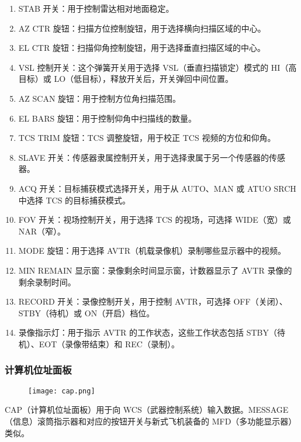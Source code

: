 \begin{enumerate}
	\item STAB 开关：用于控制雷达相对地面稳定。
	\item AZ CTR 旋钮：扫描方位控制旋钮，用于选择横向扫描区域的中心。
	\item EL CTR 旋钮：扫描仰角控制旋钮，用于选择垂直扫描区域的中心。
	\item VSL 控制开关：这个弹簧开关用于选择 VSL（垂直扫描锁定）模式的 HI（高目标）或 LO（低目标），释放开关后，开关弹回中间位置。
	\item AZ SCAN 旋钮：用于控制方位角扫描范围。
	\item EL BARS 旋钮：用于控制仰角中扫描线的数量。
	\item TCS TRIM 旋钮：TCS 调整旋钮，用于校正 TCS 视频的方位和仰角。
	\item SLAVE 开关：传感器隶属控制开关，用于选择隶属于另一个传感器的传感器。
	\item ACQ 开关：目标捕获模式选择开关，用于从 AUTO、MAN 或 ATUO SRCH 中选择 TCS 的目标捕获模式。
	\item FOV 开关：视场控制开关，用于选择 TCS 的视场，可选择 WIDE（宽）或 NAR（窄）。
	\item MODE 旋钮：用于选择 AVTR（机载录像机）录制哪些显示器中的视频。
	\item MIN REMAIN 显示窗：录像剩余时间显示窗，计数器显示了 AVTR 录像的剩余录制时间。
	\item RECORD 开关：录像控制开关，用于控制 AVTR，可选择 OFF（关闭）、STBY（待机）或 ON（开启）档位。
	\item 录像指示灯：用于指示 AVTR 的工作状态，这些工作状态包括 STBY（待机）、EOT（录像带结束）和 REC（录制）。
\end{enumerate}

\subsubsection{计算机位址面板}
\begin{figure}[htb]
	\centering
	\texttt{[image: cap.png]}
\end{figure}
CAP（计算机位址面板）用于向 WCS（武器控制系统）输入数据。MESSAGE（信息）滚筒指示器和对应的按钮开关与新式飞机装备的 MFD（多功能显示器）类似。

